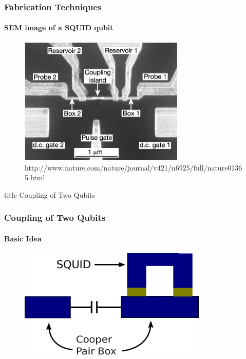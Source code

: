 \documentclass{beamer}
\begin{document}
\begin{frame}
    \frametitle{Fabrication Techniques}
    \framesubtitle{SEM image of a SQUID qubit}
    \begin{figure}[ht!]
        \centering
        \includegraphics[width=0.7\textwidth]{img/two-qubit-sem.jpg}
        \caption{http://www.nature.com/nature/journal/v421/n6925/full/nature01365.html}
    \end{figure}
\end{frame}


\begin{frame}
    \vfill
    \centering
    \begin{beamercolorbox}[sep=8pt,center,shadow=true,rounded=true]{title}
        Coupling of Two Qubits
    \end{beamercolorbox}
    \vfill
\end{frame}


\begin{frame}
    \frametitle{Coupling of Two Qubits}
    \framesubtitle{Basic Idea}
    \begin{figure}[!htb]
        \centering
        \includegraphics[width=0.8\textwidth]{img/basic-structure.eps}
    \end{figure}
\end{frame}
\end{document}
